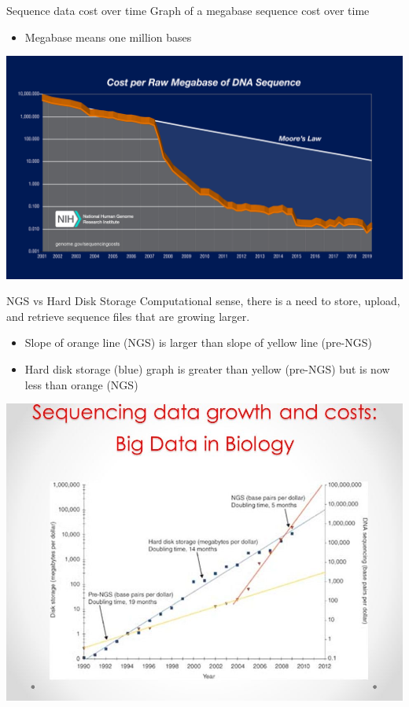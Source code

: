 \documentclass{beamer}
\begin{document}
\begin{frame}{Sequence data cost over time}
Graph of a megabase sequence cost over time \cite{genomics-cost}
\begin{itemize}
    \item Megabase means one million bases
\end{itemize}
\centering
\includegraphics[scale=0.1]{seq-cost.jpeg}
\end{frame}

\begin{frame}{NGS vs Hard Disk Storage}
Computational sense, there is a need to store, upload, and retrieve sequence files that are growing larger. 
\begin{itemize}
    \item Slope of orange line (NGS) is larger than slope of yellow line (pre-NGS)
    \item Hard disk storage (blue) graph is greater than yellow (pre-NGS) but is now less than orange (NGS)
\end{itemize}
\centering
\includegraphics[scale=0.2]{seq-data.jpeg}
\end{frame}
\end{document}

